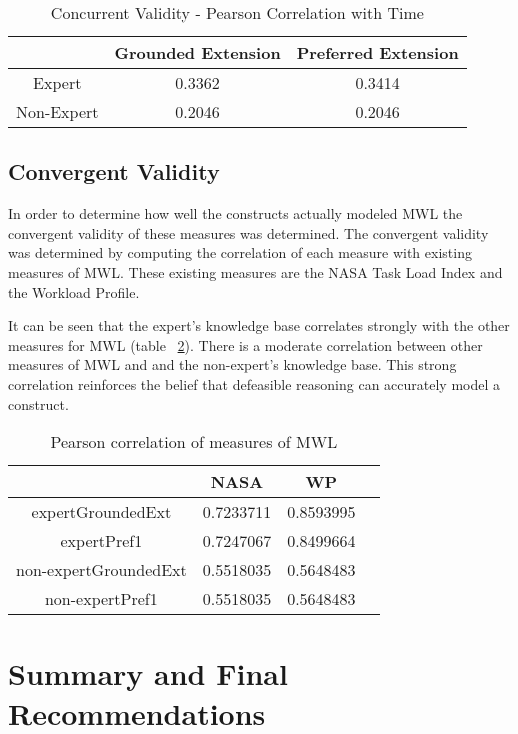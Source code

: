 \begin{table}[!htbp]
\centering
\begin{tabular}{c|c|c}
\hline
 & Grounded Extension & Preferred Extension\\ \hline
Expert & 0.3362        & 0.3414      \\
Non-Expert &  0.2046         & 0.2046  \\
\hline
\end{tabular}
\caption{Concurrent Validity - Pearson Correlation with Time}
\label{tab:ccurrent_time}
\end{table}

\subsection{Convergent Validity}

In order to determine how well the constructs actually modeled MWL the convergent validity of these measures was determined. The convergent validity was determined by computing the correlation of each measure with existing measures of MWL. These existing measures are the NASA Task Load Index and the Workload Profile. 

It can be seen that the expert's knowledge base correlates strongly with the other measures for MWL (table ~\ref{tab:corrmwlone}). There is a moderate correlation between other measures of MWL and and the non-expert's knowledge base. This strong correlation reinforces the belief that defeasible reasoning can accurately model a construct.

\begin{table}[!htbp]
\centering
\begin{tabular}{|c|c|c|c|}
\hline
                & NASA      &  WP        \\ \hline
expertGroundedExt  & 0.7233711 & 0.8593995 \\
expertPref1        & 0.7247067 & 0.8499664 \\
non-expertGroundedExt & 0.5518035 & 0.5648483 \\
non-expertPref1       & 0.5518035 & 0.5648483 \\
\hline
\end{tabular}
\caption{Pearson correlation of measures of MWL}
\label{tab:corrmwlone}
\end{table}

\section{Summary and Final Recommendations}

